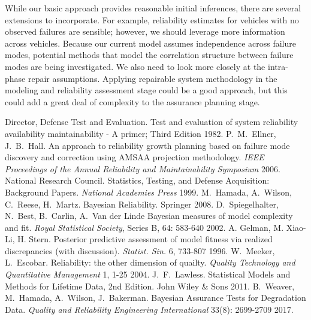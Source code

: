 \documentclass[12pt]{article}
\begin{document}
While our basic approach provides reasonable initial inferences, there are
several extensions to incorporate. For example, reliability estimates for
vehicles with no observed failures are sensible; however, we should leverage
more information across vehicles. Because our
current model assumes independence across failure modes, potential methods that model the correlation structure
between failure modes are being investigated. We
also need to look more closely at the intra-phase repair assumptions.  Applying
repairable system methodology in the modeling and reliability assessment stage
could be a good approach, but this could  add a great deal of complexity to the
assurance planning stage.


\begin{thebibliography}{99}
 Director, Defense Test and Evaluation. Test and evaluation of system reliability availability maintainability - A primer; Third Edition 1982.
 P.\ M.\ Ellner, J.\ B.\ Hall. An approach to reliability
growth planning based on failure mode discovery and correction using AMSAA
projection methodology. \textit{IEEE Proceedings of the Annual Reliability and
Maintainability Symposium} 2006.
 National Research Council. Statistics, Testing, and Defense
Acquisition: Background Papers. \textit{National Academies Press} 1999.
 M.\ Hamada, A.\  Wilson, C.\ Reese, H.\ Martz. Bayesian Reliability. Springer 2008.
 D.\  Spiegelhalter, N.\ Best, B.\ Carlin, A.\ Van der
Linde Bayesian measures of model complexity and fit. \textit{Royal Statistical
Society}, Series B, 64: 583-640 2002.
 A. Gelman, M. Xiao-Li, H. Stern. Posterior predictive assessment of model fitness via realized discrepancies (with discussion). \textit{Statist. Sin.} 6, 733-807 1996.
 W.\ Meeker, L.\ Escobar. Reliability: the other
dimension of quailty. \textit{Quality Technology and Quantitative Management} 1, 1-25 2004.
 J.\ F.\ Lawless. Statistical Models and Methods for Lifetime Data, 2nd Edition. John Wiley \& Sons 2011.
 B.\ Weaver, M.\ Hamada, A.\ Wilson, J.\ Bakerman. Bayesian Assurance Tests for Degradation Data. \textit{Quality and Reliability Engineering International} 33(8): 2699-2709  2017.
\end{thebibliography}
\end{document}
